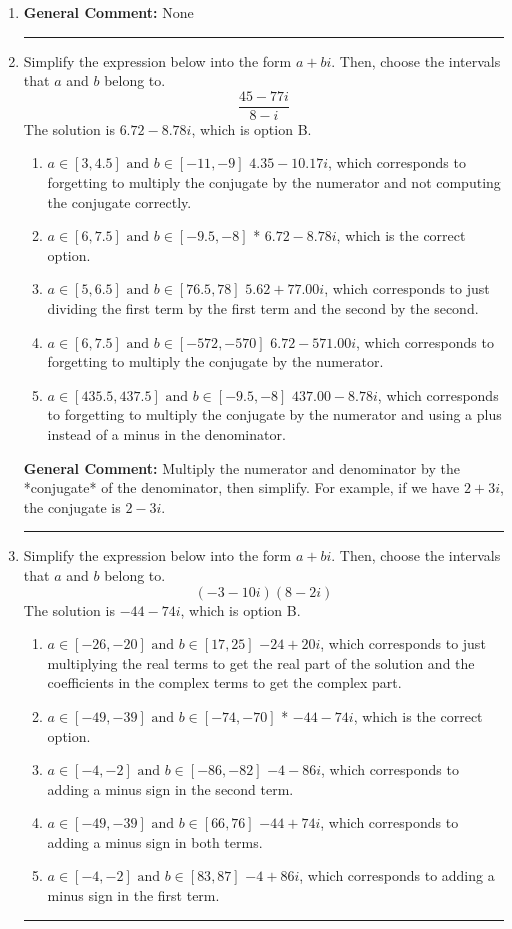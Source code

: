 \documentclass{extbook}[14pt]
\newcommand{\litem}[1]{\item #1

\rule{\textwidth}{0.4pt}}
\begin{document}
\begin{enumerate}\litem{



\textbf{General Comment:} None
}
\litem{
Simplify the expression below into the form $a+bi$. Then, choose the intervals that $a$ and $b$ belong to.
\[ \frac{45 - 77 i}{8 - i} \]
The solution is \( 6.72  - 8.78 i \), which is option B.\begin{enumerate}[label=\Alph*.]
\item \( a \in [3, 4.5] \text{ and } b \in [-11, -9] \)
 $4.35  - 10.17 i$, which corresponds to forgetting to multiply the conjugate by the numerator and not computing the conjugate correctly.
\item \( a \in [6, 7.5] \text{ and } b \in [-9.5, -8] \)
* $6.72  - 8.78 i$, which is the correct option.
\item \( a \in [5, 6.5] \text{ and } b \in [76.5, 78] \)
 $5.62  + 77.00 i$, which corresponds to just dividing the first term by the first term and the second by the second.
\item \( a \in [6, 7.5] \text{ and } b \in [-572, -570] \)
 $6.72  - 571.00 i$, which corresponds to forgetting to multiply the conjugate by the numerator.
\item \( a \in [435.5, 437.5] \text{ and } b \in [-9.5, -8] \)
 $437.00  - 8.78 i$, which corresponds to forgetting to multiply the conjugate by the numerator and using a plus instead of a minus in the denominator.
\end{enumerate}

\textbf{General Comment:} Multiply the numerator and denominator by the *conjugate* of the denominator, then simplify. For example, if we have $2+3i$, the conjugate is $2-3i$.
}
\litem{
Simplify the expression below into the form $a+bi$. Then, choose the intervals that $a$ and $b$ belong to.
\[ (-3 - 10 i)(8 - 2 i) \]
The solution is \( -44 - 74 i \), which is option B.\begin{enumerate}[label=\Alph*.]
\item \( a \in [-26, -20] \text{ and } b \in [17, 25] \)
 $-24 + 20 i$, which corresponds to just multiplying the real terms to get the real part of the solution and the coefficients in the complex terms to get the complex part.
\item \( a \in [-49, -39] \text{ and } b \in [-74, -70] \)
* $-44 - 74 i$, which is the correct option.
\item \( a \in [-4, -2] \text{ and } b \in [-86, -82] \)
 $-4 - 86 i$, which corresponds to adding a minus sign in the second term.
\item \( a \in [-49, -39] \text{ and } b \in [66, 76] \)
 $-44 + 74 i$, which corresponds to adding a minus sign in both terms.
\item \( a \in [-4, -2] \text{ and } b \in [83, 87] \)
 $-4 + 86 i$, which corresponds to adding a minus sign in the first term.
\end{enumerate}

}
\end{enumerate}
\end{document}
